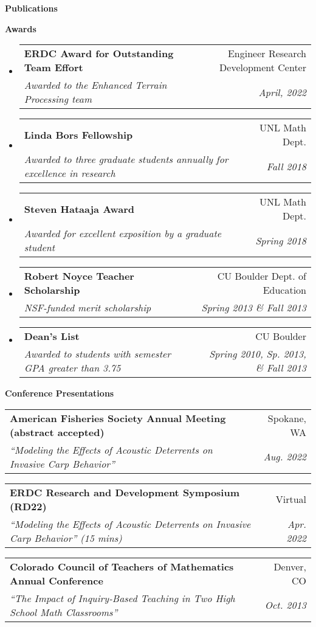 \documentclass[letterpaper,11pt]{article}
\makeatletter
\newcommand{\resitem}[1]{\item #1 \vspace{-2pt}}
\newcommand{\resheading}[1]{{\large \colorbox{mygrey}{\begin{minipage}{\textwidth}{\textbf{#1 \vphantom{p\^{E}}}}\end{minipage}}}}
\newcommand{\ressubheading}[4]{
\begin{tabular*}{6.5in}{l@{\extracolsep{\fill}}r}
		\textbf{#1} & #2 \\
		\textit{#3} & \textit{#4} \\
\end{tabular*}\vspace{-6pt}}
\makeatother
\begin{document}
\begin{itemize}
{\begin{itemize}
				\end{itemize}
				}
	\end{itemize}

\resheading{Publications}

\nocite{*}
\printbibliography[heading=none]

\resheading{Awards}
\begin{itemize}
	\item
	\ressubheading{ERDC Award for Outstanding Team Effort}{Engineer Research Development Center}{Awarded to the Enhanced Terrain Processing team}{April, 2022}
	\item
	\ressubheading{Linda Bors Fellowship}{UNL Math Dept.}{Awarded to three graduate students annually for excellence in research}{Fall 2018}
	\item
	\ressubheading{Steven Hataaja Award}{UNL Math Dept.}{Awarded for excellent exposition by a graduate student}{Spring 2018}
	\item
	\ressubheading{Robert Noyce Teacher Scholarship}{CU Boulder Dept. of Education}{NSF-funded merit scholarship}{Spring 2013 \& Fall 2013}
	\item
	\ressubheading{Dean's List}{CU Boulder}{Awarded to students with semester GPA greater than 3.75}{Spring 2010, Sp. 2013, \& Fall 2013}
\end{itemize}

\resheading{Conference Presentations}
	\begin{etaremune}
		\item
			\ressubheading{American Fisheries Society Annual Meeting (abstract accepted)}{Spokane, WA}{``Modeling the Effects of Acoustic Deterrents on Invasive Carp Behavior''}{Aug. 2022}
		\item
			\ressubheading{ERDC Research and Development Symposium (RD22)}{Virtual}{``Modeling the Effects of Acoustic Deterrents on Invasive Carp Behavior'' (15 mins)}{Apr. 2022}
		\item
			\ressubheading{Colorado Council of Teachers of Mathematics Annual Conference}{Denver, CO}{``The Impact of Inquiry-Based Teaching in Two High School Math Classrooms''}{Oct. 2013}
	\end{etaremune}
	
\end{document}
